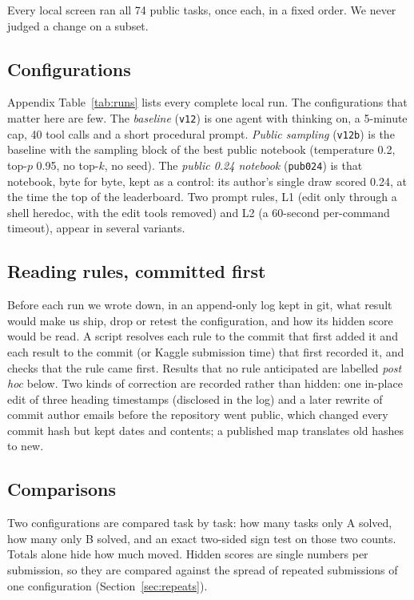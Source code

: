 \documentclass[11pt]{article}
\begin{document}
Every local screen ran all 74 public tasks, once each, in a fixed order. We never judged a change on a subset.

\subsection{Configurations}
Appendix Table~\ref{tab:runs} lists every complete local run. The configurations that matter here are few. The
\emph{baseline} (\texttt{v12}) is one agent with thinking on, a 5-minute cap, 40 tool calls and a short procedural prompt.
\emph{Public sampling} (\texttt{v12b}) is the baseline with the sampling block of the best public notebook (temperature 0.2,
top-$p$ 0.95, no top-$k$, no seed). The \emph{public 0.24 notebook} (\texttt{pub024}) is that notebook, byte for byte, kept as
a control: its author's single draw scored 0.24, at the time the top of the leaderboard. Two prompt rules, L1 (edit only
through a shell heredoc, with the edit tools removed) and L2 (a 60-second per-command timeout), appear in several variants.

\subsection{Reading rules, committed first}
Before each run we wrote down, in an append-only log kept in git, what result would make us ship, drop or retest the
configuration, and how its hidden score would be read. A script resolves each rule to the commit that first added it and each
result to the commit (or Kaggle submission time) that first recorded it, and checks that the rule came first. Results that no
rule anticipated are labelled \emph{post hoc} below. Two kinds of correction are recorded rather than hidden: one in-place edit
of three heading timestamps (disclosed in the log) and a later rewrite of commit author emails before the repository went
public, which changed every commit hash but kept dates and contents; a published map translates old hashes to new.

\subsection{Comparisons}
Two configurations are compared task by task: how many tasks only A solved, how many only B solved, and an exact two-sided
sign test on those two counts. Totals alone hide how much moved. Hidden scores are single numbers per submission, so they
are compared against the spread of repeated submissions of one configuration (Section~\ref{sec:repeats}).
\end{document}

